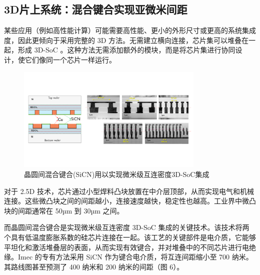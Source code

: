 \subsection{3D片上系统：混合键合实现亚微米间距}

某些应用（例如高性能计算）可能需要高性能、更小的外形尺寸或更高的系统集成度，因此更倾向于采用完整的 3D 方法。无需建立横向连接，芯片集可以堆叠在一起，形成 3D-SoC \cite{8429741}。这种方法无需添加额外的模块，而是将芯片集进行协同设计，使它们像同一个芯片一样运行。

\begin{figure}[htbp]
	\centering
	\includegraphics[width=0.8\textwidth]{img/3.-bump-pitch2.png} %
	\caption{晶圆间混合键合(SiCN)用以实现微米级互连密度3D-SoC集成 }
	\label{fig:example}
\end{figure}

对于 2.5D 技术，芯片通过小型焊料凸块放置在中介层顶部，从而实现电气和机械连接。这些微凸块之间的间距越小，连接速度越快，稳定性也越高。工业界中微凸块的间距通常在 50µm 到 30µm 之间。

而晶圆间混合键合是实现微米级互连密度 3D-SoC 集成的关键技术。该技术将两个具有低温度膨胀系数的硅芯片连接在一起。该工艺的关键部件是电介质，它能够平坦化和激活堆叠层的表面，从而实现有效键合，并对堆叠中的不同芯片进行电绝缘。Imec 的专有方法采用 SiCN 作为键合电介质，将互连间距缩小至 700 纳米。其路线图甚至预测了 400 纳米和 200 纳米的间距（图 6）。


